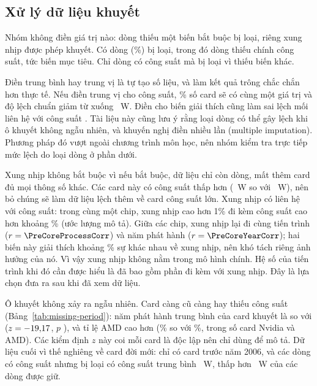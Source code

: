 \subsection{Xử lý dữ liệu khuyết}
\label{sec:missing}

Nhóm không điền giá trị nào: dòng thiếu một biến bắt buộc bị loại, riêng xung nhịp được
phép khuyết. Có \PreRowsIncomplete{} dòng (\PreRowsIncompletePct\%) bị loại, trong đó
\PrePowerMissing{} dòng thiếu chính công suất, tức biến mục tiêu. Chỉ
\PrePowerRowsLostByDropAll{} dòng có công suất mà bị loại vì thiếu biến khác.

Điền trung bình hay trung vị là tự tạo số liệu, và làm kết quả trông chắc chắn hơn thực tế.
Nếu điền trung vị cho công suất, \PrePowerAtMedianImputed\% số card sẽ có cùng một giá trị và
độ lệch chuẩn giảm từ \PrePowerSdDropped{} xuống \PrePowerSdImputed~W. Điền cho biến giải thích
cũng làm sai lệch mối liên hệ với công suất \cite{donders2006}. Tài liệu này cũng lưu ý rằng
loại dòng có thể gây lệch khi ô khuyết không ngẫu nhiên, và khuyến nghị điền nhiều lần
(multiple imputation). Phương pháp đó vượt ngoài chương trình môn học, nên nhóm kiểm tra trực
tiếp mức lệch do loại dòng ở phần dưới.

Xung nhịp không bắt buộc vì nếu bắt buộc, dữ liệu chỉ còn \PreRowsIfCoreRequired{} dòng,
mất thêm \PreCoreMissingInFinal{} card đủ mọi thông số khác. Các card này có công suất thấp hơn
(\PreCoreMissingPowerMean~W so với \PreCoreKnownPowerMean~W), nên bỏ chúng sẽ làm dữ liệu lệch
thêm về card công suất lớn. Xung nhịp có liên hệ với công suất: trong cùng một chip, xung nhịp
cao hơn 1\% đi kèm công suất cao hơn khoảng \PreCoreWithinChipElasticity\% (ước lượng mô tả).
Giữa các chip, xung nhịp lại đi cùng tiến trình ($r = \PreCoreProcessCorr$) và năm phát hành
($r = \PreCoreYearCorr$); hai biến này giải thích khoảng \PreCoreExplainedPct\% sự khác nhau về
xung nhịp, nên khó tách riêng ảnh hưởng của nó. Vì vậy xung nhịp không nằm trong mô hình chính.
Hệ số của tiến trình khi đó cần được hiểu là đã bao gồm phần đi kèm với xung nhịp. Đây là lựa
chọn đưa ra sau khi đã xem dữ liệu.

Ô khuyết không xảy ra ngẫu nhiên. Card càng cũ càng hay thiếu công suất
(Bảng~\ref{tab:missing-period}): năm phát hành trung bình của card khuyết là
\PreMissingMeanYear{} so với \PreObservedMeanYear{} ($z = -19{,}17$,
$p$ \PreMissingYearP), và tỉ lệ AMD cao hơn (\PreMissingAmdPct\% so với
\PreObservedAmdPct\%, trong số card Nvidia và AMD). Các kiểm định $z$ này coi mỗi card là
độc lập nên chỉ dùng để mô tả. Dữ liệu cuối vì thế nghiêng về card đời mới: chỉ có
\PreRowsBeforeTwoThousandSix{} card trước năm 2006, và các dòng có công suất nhưng bị loại có
công suất trung bình \PreLostPowerMean~W, thấp hơn \PreFinalPowerMean~W của các dòng được giữ.

